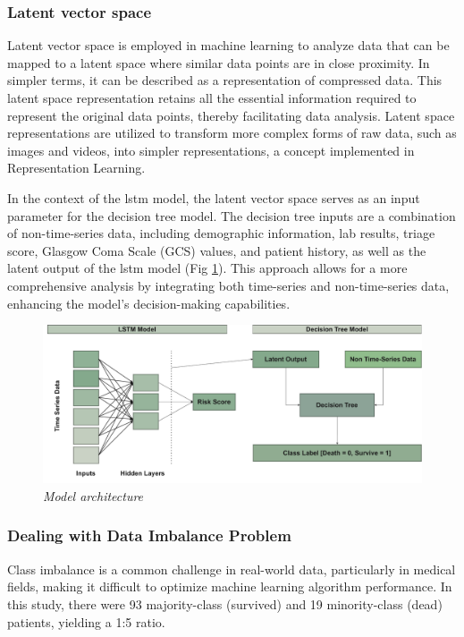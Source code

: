 \documentclass[journal,article,submit,pdftex,moreauthors]{Definitions/mdpi}
\begin{document}
\subsubsection{Latent vector space}

Latent vector space is employed in machine learning to analyze data that can be mapped to a latent space where similar data points are in close proximity. In simpler terms, it can be described as a representation of compressed data. This latent space representation retains all the essential information required to represent the original data points, thereby facilitating data analysis. Latent space representations are utilized to transform more complex forms of raw data, such as images and videos, into simpler representations, a concept implemented in Representation Learning.

In the context of the \gls{lstm} model, the latent vector space serves as an input parameter for the decision tree model. The decision tree inputs are a combination of non-time-series data, including demographic information, lab results, triage score, Glasgow Coma Scale (GCS) values, and patient history, as well as the latent output of the \gls{lstm} model (Fig \ref{fig:figure6}). This approach allows for a more comprehensive analysis by integrating both time-series and non-time-series data, enhancing the model's decision-making capabilities.

\begin{figure}[hbt!]
    \centering
    \includegraphics[width=\linewidth]{images/modelArchitecture.pdf}
    \caption{\textit{Model architecture}}
    \label{fig:figure6}
    \vspace{-10pt}
\end{figure}

\subsubsection{Dealing with Data Imbalance Problem}
Class imbalance is a common challenge in real-world data, particularly in medical fields, making it difficult to optimize machine learning algorithm performance. In this study, there were 93 majority-class (survived) and 19 minority-class (dead) patients, yielding a 1:5 ratio.
\end{document}
